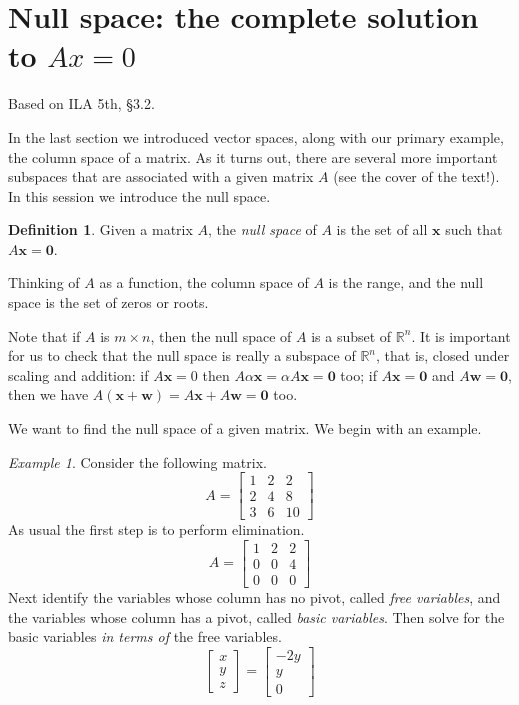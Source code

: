 \documentclass[11pt,oneside]{amsbook}
\newcommand{\R}{\mathbb R}
\theoremstyle{definition}
\theoremstyle{plain}
\theoremstyle{definition}
\newtheorem{definition}[theorem]{Definition}
\theoremstyle{remark}
\newtheorem{example}[theorem]{Example}
\numberwithin{equation}{section}
\numberwithin{figure}{section}
\begin{document}
\newpage
\section{Null space: the complete solution to $Ax=0$}

Based on ILA 5th, \S 3.2.

In the last section we introduced vector spaces, along with our primary example, the column space of a matrix. As it turns out, there are several more important subspaces that are associated with a given matrix $A$ (see the cover of the text!). In this session we introduce the null space.

\begin{definition}
  Given a matrix $A$, the \emph{null space} of $A$ is the set of all $\bm{x}$ such that $A\bm{x}=\bm{0}$.
\end{definition}

Thinking of $A$ as a function, the column space of $A$ is the range, and the null space is the set of zeros or roots.

Note that if $A$ is $m\times n$, then the null space of $A$ is a subset of $\R^n$. It is important for us to check that the null space is really a subspace of $\R^n$, that is, closed under scaling and addition: if $A\bm{x}=0$ then $A\alpha\bm{x}=\alpha A\bm{x}=\bm{0}$ too; if $A\bm{x}=\bm{0}$ and $A\bm{w}=\bm{0}$, then we have $A(\bm{x}+\bm{w})=A\bm{x}+A\bm{w}=\bm{0}$ too.

We want to find the null space of a given matrix. We begin with an example.

\begin{example}
  Consider the following matrix.
  \[A=\begin{bmatrix}1&2&2\\2&4&8\\3&6&10\end{bmatrix}
  \]
  As usual the first step is to perform elimination.
  \[A=\begin{bmatrix}1&2&2\\0&0&4\\0&0&0\end{bmatrix}
  \]
  Next identify the variables whose column has no pivot, called \emph{free variables}, and the variables whose column has a pivot, called \emph{basic variables}. Then solve for the basic variables \emph{in terms of} the free variables.
  \[\begin{bmatrix}x\\y\\z\end{bmatrix}
    =\begin{bmatrix}-2y\\y\\0\end{bmatrix}
  \]
\end{example}
\end{document}
